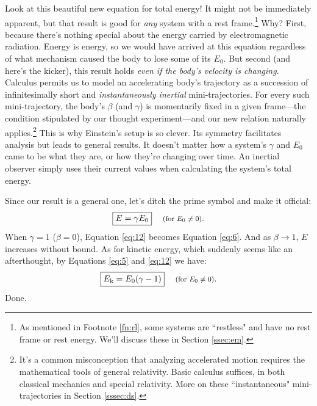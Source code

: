 \documentclass[12pt]{article}
\begin{document}
Look at this beautiful new equation for total energy! It might not be immediately apparent, but that result is good for \emph{any} system with a rest frame.\footnote{As mentioned in Footnote \ref{fn:rl}, some systems are ``restless" and have no rest frame or rest energy. We'll discuss these in Section \ref{ssec:em}.} Why? First, because there's nothing special about the energy carried by electromagnetic radiation. Energy is energy, so we would have arrived at this equation regardless of what mechanism caused the body to lose some of its $E_0$. But second (and here's the kicker), this result holds \emph{even if the body's velocity is changing}. Calculus permits us to model an accelerating body's trajectory as a succession of infinitesimally short and \emph{instantaneously inertial} mini-trajectories. For every such mini-trajectory, the body's $\beta$ (and $\gamma$) is momentarily fixed in a given frame---the condition stipulated by our thought experiment---and our new relation naturally applies.\footnote{It's a common misconception that analyzing accelerated motion requires the mathematical tools of general relativity. Basic calculus suffices, in both classical mechanics and special relativity. More on these ``instantaneous" mini-trajectories in Section \ref{sssec:ds}.} This is why Einstein's setup is so clever. Its symmetry facilitates analysis but leads to general results. It doesn't matter how a system's $\gamma$ and $E_0$ came to be what they are, or how they're changing over time. An inertial observer simply uses their current values when calculating the system's total energy.

Since our result is a general one, let's ditch the prime symbol and make it official:
\begin{equation}\label{eq:12}
\boxed{E = \gamma E_0} \quad \textrm{\footnotesize{ (for $E_0 \neq 0$)}}.
\end{equation}
When $\gamma=1$ ($\beta=0$), Equation \ref{eq:12} becomes Equation \ref{eq:6}. And as $\beta \rightarrow 1$, $E$ increases without bound. As for kinetic energy, which suddenly seems like an afterthought, by Equations \ref{eq:5} and \ref{eq:12} we have:
\begin{equation}\label{eq:13}
\boxed{E_{\mkern.5mu \textrm{k}} = E_0 (\gamma - 1)} \quad \textrm{\footnotesize{ (for $E_0 \neq 0$)}}.
\end{equation}
Done.
\end{document}

